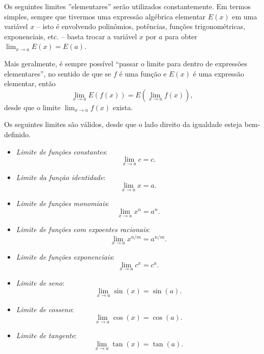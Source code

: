 Os seguintes limites ''elementares'' serão utilizados constantemente. Em termos simples, sempre que tivermos uma expressão algébrica elementar $E(x)$ em uma variável $x$ -- isto é envolvendo polinômios, potências, funções trigonométricas, exponenciais, etc. -- basta trocar a variável $x$ por $a$ para obter $\lim_{x\to a}E(x)=E(a)$.

Mais geralmente, é sempre possível ``passar o limite para dentro de expressões elementares'', no sentido de que se $f$ é uma função e $E(x)$ é uma expressão elementar, então
\[\lim_{x\to a} E(f(x))=E\left(\lim_{x\to a}f(x)\right),\]
desde que o limite $\lim_{x\to a}f(x)$ exista.

Os seguintes limites são válidos, desde que o lado direito da igualdade esteja bem-definido.

\begin{itemize}
	\item \emph{Limite de funções constantes}:
	\[\lim_{x\to a}c=c.\]
	\item \emph{Limite da função identidade}:
	\[\lim_{x\to a}x=a.\]
	\item \emph{Limite de funções monomiais}:
	\[\lim_{x\to a}x^n=a^n.\]
	\item \emph{Limite de funções com expoentes racionais}:
	\[\lim_{x\to a}x^{n/m}=a^{n/m}.\]
	\item \emph{Limite de funções exponenciais}:
	\[\lim_{x\to a}c^x=c^a.\]
	\item \emph{Limite de seno}:
	\[\lim_{x\to a}\sin(x)=\sin(a).\]
	\item \emph{Limite de cosseno}:
	\[\lim_{x\to a}\cos(x)=\cos(a).\]
	\item \emph{Limite de tangente}:
	\[\lim_{x\to a}\tan(x)=\tan(a).\]
\end{itemize}
